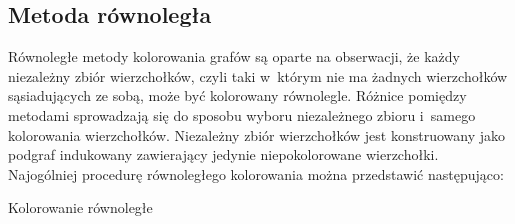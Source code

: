 \documentclass{article}
\begin{document}
	\subsection{Metoda równoległa}
	Równoległe metody kolorowania grafów są oparte na obserwacji, że każdy niezależny zbiór wierzchołków, czyli taki w~którym nie ma żadnych wierzchołków sąsiadujących ze sobą, może być kolorowany równolegle. Różnice pomiędzy metodami sprowadzają się do sposobu wyboru niezależnego zbioru i~samego kolorowania wierzchołków. Niezależny zbiór wierzchołków jest konstruowany jako podgraf indukowany zawierający jedynie niepokolorowane wierzchołki. Najogólniej procedurę równoległego kolorowania można przedstawić następująco:
	\\
	
\begin{algorithm}[H]
	\SetAlgoLined
	\caption{Kolorowanie równoległe}
\end{algorithm}
%	
\ \\ 
\end{document}
